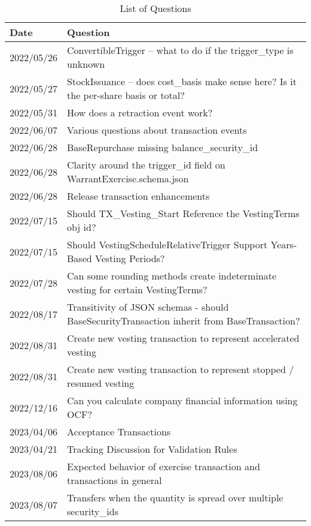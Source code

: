 \begin{longtable}{l|p{10cm}}%
\caption{List of Questions}\label{tab:list-of-questions-ocf-qa} \\
\hline
    \textbf{Date} & \textbf{Question} \\ 
    \hline
    2022/05/26 & ConvertibleTrigger -- what to do if the trigger\_type is unknown \\
    \hline
    2022/05/27 & StockIssuance -- does cost\_basis make sense here? Is it the per-share basis or total? \\
    \hline
    2022/05/31 & How does a retraction event work? \\
    \hline
    2022/06/07 & Various questions about transaction events \\
    \hline
    2022/06/28 & BaseRepurchase missing balance\_security\_id \\
    \hline
    2022/06/28 & Clarity around the trigger\_id field on WarrantExercise.schema.json \\
    \hline
    2022/06/28 & Release transaction enhancements \\
    \hline
    2022/07/15 & Should TX\_Vesting\_Start Reference the VestingTerms obj id? \\
    \hline
    2022/07/15 & Should VestingScheduleRelativeTrigger Support Years-Based Vesting Periods? \\
    \hline
    2022/07/28 & Can some rounding methods create indeterminate vesting for certain VestingTerms? \\
    \hline
    2022/08/17 & Transitivity of JSON schemas - should BaseSecurityTransaction inherit from BaseTransaction? \\
    \hline
    2022/08/31 & Create new vesting transaction to represent accelerated vesting \\
    \hline
    2022/08/31 & Create new vesting transaction to represent stopped / resumed vesting \\
    \hline
    2022/12/16 & Can you calculate company financial information using OCF? \\
    \hline
    2023/04/06 & Acceptance Transactions \\
    \hline
    2023/04/21 & Tracking Discussion for Validation Rules \\
    \hline
    2023/08/06 & Expected behavior of exercise transaction and transactions in general \\
    \hline
    2023/08/07 & Transfers when the quantity is spread over multiple security\_ids \\
    \hline
\end{longtable}